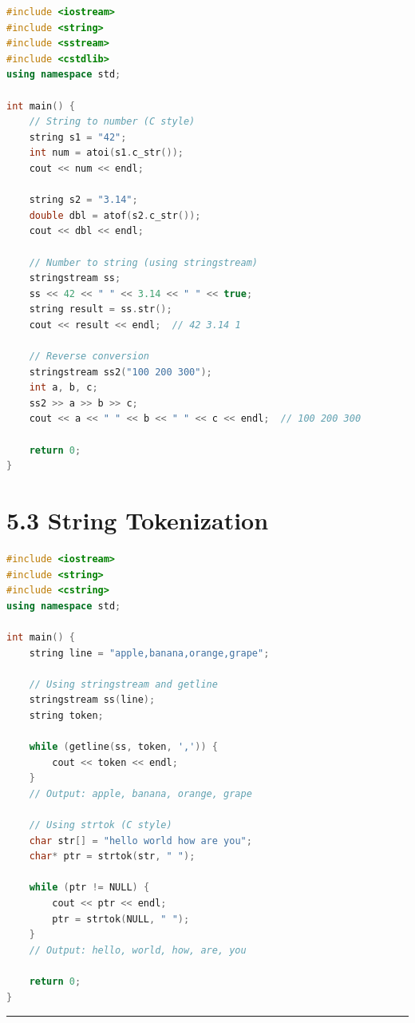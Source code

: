 \begin{lstlisting}[language={C++}]
#include <iostream>
#include <string>
#include <sstream>
#include <cstdlib>
using namespace std;

int main() {
    // String to number (C style)
    string s1 = "42";
    int num = atoi(s1.c_str());
    cout << num << endl;
    
    string s2 = "3.14";
    double dbl = atof(s2.c_str());
    cout << dbl << endl;
    
    // Number to string (using stringstream)
    stringstream ss;
    ss << 42 << " " << 3.14 << " " << true;
    string result = ss.str();
    cout << result << endl;  // 42 3.14 1
    
    // Reverse conversion
    stringstream ss2("100 200 300");
    int a, b, c;
    ss2 >> a >> b >> c;
    cout << a << " " << b << " " << c << endl;  // 100 200 300
    
    return 0;
}
\end{lstlisting}

\hypertarget{string-tokenization}{%
\section{5.3 String Tokenization}\label{string-tokenization}}

\begin{lstlisting}[language={C++}]
#include <iostream>
#include <string>
#include <cstring>
using namespace std;

int main() {
    string line = "apple,banana,orange,grape";
    
    // Using stringstream and getline
    stringstream ss(line);
    string token;
    
    while (getline(ss, token, ',')) {
        cout << token << endl;
    }
    // Output: apple, banana, orange, grape
    
    // Using strtok (C style)
    char str[] = "hello world how are you";
    char* ptr = strtok(str, " ");
    
    while (ptr != NULL) {
        cout << ptr << endl;
        ptr = strtok(NULL, " ");
    }
    // Output: hello, world, how, are, you
    
    return 0;
}
\end{lstlisting}

\begin{center}\rule{0.5\linewidth}{0.5pt}\end{center}
